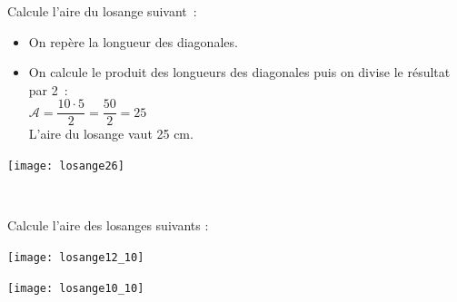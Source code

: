 \vspace{4em}

\begin{methode*1}


 
 \begin{exemple*1}
Calcule l’aire du losange suivant :
\begin{minipage}[c]{0.68\textwidth}
\begin{itemize}
 \item On repère la longueur des diagonales.
 \item On calcule le produit des longueurs des diagonales puis on divise le résultat par 2 : \\[0.3em]
$\mathcal{A} = \dfrac{10 \cdot 5}{2} = \dfrac{50}{2} = 25$ \\[0.3em]
L'aire du losange vaut 25 cm.
 \end{itemize}
 \end{minipage} \hfill%
 \begin{minipage}[c]{0.2\textwidth}
 \texttt{[image: losange26]}
 \end{minipage} \\
\end{exemple*1}

 
 \exercice
Calcule l’aire des losanges suivants :
\begin{colenumerate}{2}
 \item
 
 \texttt{[image: losange12\_10]}
 \item
 
 \texttt{[image: losange10\_10]}
 \end{colenumerate}

\end{methode*1}

